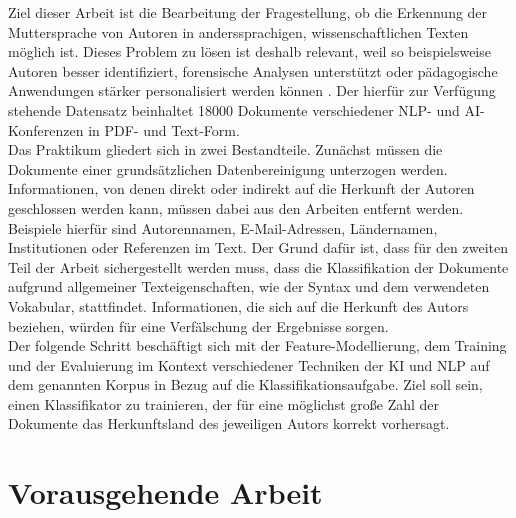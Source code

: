 \documentclass[bachelor,german]{info1thesis}
\begin{document}
Ziel dieser Arbeit ist die Bearbeitung der Fragestellung, ob die Erkennung der Muttersprache von Autoren in anderssprachigen, wissenschaftlichen Texten möglich ist. Dieses Problem zu lösen ist deshalb relevant, weil so beispielsweise Autoren besser identifiziert, forensische Analysen unterstützt oder pädagogische Anwendungen stärker personalisiert werden können \cite{Estival2007,Gibbons2003,Rozovskaya2011}.
Der hierfür zur Verfügung stehende Datensatz beinhaltet 18000 Dokumente verschiedener NLP- und AI-Konferenzen in PDF- und Text-Form. \\
Das Praktikum gliedert sich in zwei Bestandteile. Zunächst müssen die Dokumente einer grundsätzlichen Datenbereinigung unterzogen werden. Informationen, von denen direkt oder indirekt auf die Herkunft der Autoren geschlossen werden kann, müssen dabei aus den Arbeiten entfernt werden. Beispiele hierfür sind Autorennamen, E-Mail-Adressen, Ländernamen, Institutionen oder Referenzen im Text. Der Grund dafür ist, dass für den zweiten Teil der Arbeit sichergestellt werden muss, dass die Klassifikation der Dokumente aufgrund allgemeiner Texteigenschaften, wie der Syntax und dem verwendeten Vokabular, stattfindet.
Informationen, die sich auf die Herkunft des Autors beziehen, würden für eine Verfälschung der Ergebnisse sorgen. \\
Der folgende Schritt beschäftigt sich mit der Feature-Modellierung, dem Training und der Evaluierung im Kontext verschiedener Techniken der KI und NLP auf dem genannten Korpus in Bezug auf die Klassifikationsaufgabe. Ziel soll sein, einen Klassifikator zu trainieren, der für eine möglichst große Zahl der Dokumente das Herkunftsland des jeweiligen Autors korrekt vorhersagt. 

\chapter{Vorausgehende Arbeit}
\end{document}
